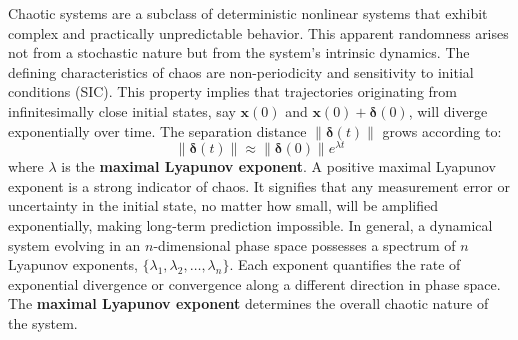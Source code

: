 \documentclass[a4paper,12pt]{article}
\begin{document}
Chaotic systems are a subclass of deterministic nonlinear systems that exhibit complex and practically unpredictable behavior. This apparent randomness arises not from a stochastic nature but from the system's intrinsic dynamics. The defining characteristics of chaos are non-periodicity and sensitivity to initial conditions (SIC). This property implies that trajectories originating from infinitesimally close initial states, say $\mathbf{x}(0)$ and $\mathbf{x}(0) + \bm{\delta}(0)$, will diverge exponentially over time. The separation distance $\|\bm{\delta}(t)\|$ grows according to:
\begin{equation}
    \|\bm{\delta}(t)\| \approx \|\bm{\delta}(0)\| e^{\lambda t}
\end{equation}
where $\lambda$ is the \textbf{maximal Lyapunov exponent}. A positive maximal Lyapunov exponent is a strong indicator of chaos. It signifies that any measurement error or uncertainty in the initial state, no matter how small, will be amplified exponentially, making long-term prediction impossible. 
In general, a dynamical system evolving in an $n$-dimensional phase space possesses a spectrum of $n$ Lyapunov exponents, $\{\lambda_1, \lambda_2, \ldots, \lambda_n\}$. Each exponent quantifies the rate of exponential divergence or convergence along a different direction in phase space. The \textbf{maximal Lyapunov exponent} determines the overall chaotic nature of the system.
\end{document}
